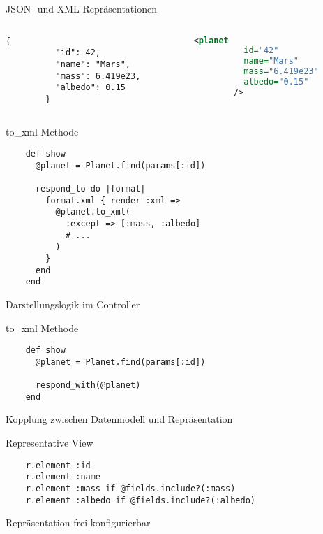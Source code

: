\begin{frame}[fragile]{JSON- und XML-Repräsentationen}

  \begin{columns}[t]
    \begin{column}{.45\textwidth}
      \begin{lstlisting}[language={},gobble=8]
        {
          "id": 42,
          "name": "Mars",
          "mass": 6.419e23,
          "albedo": 0.15
        }
      \end{lstlisting}
    \end{column}
    \begin{column}{.45\textwidth}
      \begin{lstlisting}[language=XML,gobble=8]
        <planet
          id="42"
          name="Mars"
          mass="6.419e23"
          albedo="0.15"
        />
      \end{lstlisting}
    \end{column}
  \end{columns}
\end{frame}

\begin{frame}[fragile]{to\_xml Methode}
  \begin{lstlisting}
    def show
      @planet = Planet.find(params[:id])

      respond_to do |format|
        format.xml { render :xml =>
          @planet.to_xml(
            :except => [:mass, :albedo]
            # ...
          )
        }
      end
    end
  \end{lstlisting}

  Darstellungslogik im Controller \badmark
\end{frame}

\begin{frame}[fragile]{to\_xml Methode}
  \begin{lstlisting}
    def show
      @planet = Planet.find(params[:id])

      respond_with(@planet)
    end
  \end{lstlisting}

  Kopplung zwischen Datenmodell und Repräsentation \badmark
\end{frame}

\begin{frame}[fragile]{Representative View}
  \begin{lstlisting}
    r.element :id
    r.element :name
    r.element :mass if @fields.include?(:mass)
    r.element :albedo if @fields.include?(:albedo)
  \end{lstlisting}

  Repräsentation frei konfigurierbar \goodmark
\end{frame}

